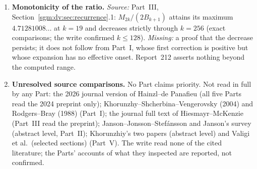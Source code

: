 \documentclass[11pt,letterpaper]{article}
\theoremstyle{remark}\newtheorem{remark}[theorem]{Remark}
\theoremstyle{definition}\newtheorem{definition}[theorem]{Definition}
\begin{document}
\begin{enumerate}
\item\label{sgm:q:monotone} \textbf{Monotonicity of the ratio.} \emph{Source:} Part~III, Section~\ref{sgm:dv:sec:recurrence}.1: $M_{2k}/(2B_{k+1})$ attains its maximum $4.71281008\ldots$ at $k=19$ and decreases strictly through $k=256$ (exact comparisons; the write confirmed $k\le128$). \emph{Missing:} a proof that the decrease persists; it does not follow from Part~I, whose first correction is positive but whose expansion has no effective onset. Report~212 asserts nothing beyond the computed range.
\item\label{sgm:q:literature} \textbf{Unresolved source comparisons.} No Part claims priority. Not read in full by any Part: the 2026 journal version of Hainzl--de Panafieu (all five Parts read the 2024 preprint only); Khorunzhy--Shcherbina--Vengerovsky (2004) and Rodgers--Bray (1988) (Part~I); the journal full text of Hiesmayr--McKenzie (Part~III read the preprint); Janson--Jonsson--Stef\'ansson and Janson's survey (abstract level, Part~II); Khorunzhiy's two papers (abstract level) and Valigi et al.\ (selected sections) (Part~V). The write read none of the cited literature; the Parts' accounts of what they inspected are reported, not confirmed.
\end{enumerate}
\end{document}
